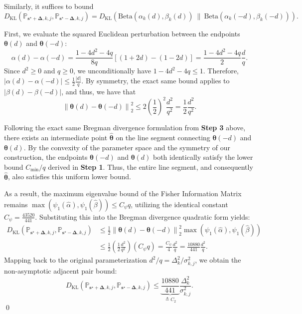 \documentclass{article}
\newcommand{\Beta}{\mathrm{Beta}}
\def\vs{{\bm{s}}}
\def\sP{{\mathbb{P}}}
\newcommand{\KL}{D_{\mathrm{KL}}}
\theoremstyle{plain}
\theoremstyle{definition}
\theoremstyle{plain}
\newcommand{\bignorm}[1]{\left\lVert #1 \right\rVert}
\begin{document}
Similarly, it suffices to bound
\begin{equation}
    \KL\left( \sP_{\vs^\star+\bm\Delta,k,j}, \sP_{\vs^\star-\bm\Delta,k,j} \right) = \KL\left( \Beta(\alpha_k(d), \beta_k(d)) \ \| \ \Beta(\alpha_k(-d), \beta_k(-d)) \right).
\end{equation}

First, we evaluate the squared Euclidean perturbation between the endpoints $\bm\theta(d)$ and $\bm\theta(-d)$:
\begin{equation}
    \alpha(d) - \alpha(-d) = \frac{1 - 4 d^2 - 4 q}{8 q} \left[ (1 + 2d) - (1 - 2d) \right] = \frac{1 - 4 d^2 - 4 q}{2} \frac{d}{q}.
\end{equation}
Since $d^2 \ge 0$ and $q \ge 0$, we unconditionally have $1 - 4 d^2 - 4 q \leq 1$. Therefore, $|\alpha(d) - \alpha(-d)| \leq \frac{1}{2} \frac{|d|}{q}$. By symmetry, the exact same bound applies to $|\beta(d) - \beta(-d)|$, and thus, we have that
\begin{equation}
    \bignorm{\bm\theta(d) - \bm\theta(-d)}_2^2 \leq 2 \left( \frac{1}{2} \right)^2 \frac{d^2}{q^2} = \frac{1}{2} \frac{d^2}{q^2}.
\end{equation}

Following the exact same Bregman divergence formulation from \textbf{Step 3} above, there exists an intermediate point $\hat{\bm\theta}$ on the line segment connecting $\bm\theta(-d)$ and $\bm\theta(d)$. By the convexity of the parameter space and the symmetry of our construction, the endpoints $\bm\theta(-d)$ and $\bm\theta(d)$ both identically satisfy the lower bound $C_{\min}/q$ derived in \textbf{Step 1}.
Thus, the entire line segment, and consequently $\hat{\bm\theta}$, also satisfies this uniform lower bound.

As a result, the maximum eigenvalue bound of the Fisher Information Matrix remains $\max(\psi_1(\hat{\alpha}), \psi_1(\hat{\beta})) \leq C_\psi q$, utilizing the identical constant $C_\psi = \frac{43520}{441}$.
Substituting this into the Bregman divergence quadratic form yields:
\begin{align}
    \KL(\sP_{\vs^\star+\bm\Delta,k,j}, \sP_{\vs^\star-\bm\Delta,k,j}) &\leq \frac{1}{2} \bignorm{\bm\theta(d) - \bm\theta(-d)}_2^2 \max(\psi_1(\hat{\alpha}), \psi_1(\hat{\beta})) \\
    &\leq \frac{1}{2} \left( \frac{1}{2} \frac{d^2}{q^2} \right) (C_\psi q) = \frac{C_\psi}{4} \frac{d^2}{q} = \frac{10880}{441} \frac{d^2}{q}.
\end{align}
Mapping back to the original parameterization $d^2/q = \Delta_k^2 / \sigma_{k,j}^2$, we obtain the non-asymptotic adjacent pair bound:
\begin{equation}
    \KL(\sP_{\vs^\star+\bm\Delta,k,j}, \sP_{\vs^\star-\bm\Delta,k,j}) \leq \underbrace{\frac{10880}{441}}_{\triangleq C_2} \frac{\Delta_k^2}{\sigma_{k,j}^2}.
\end{equation}
\qed
\end{document}
